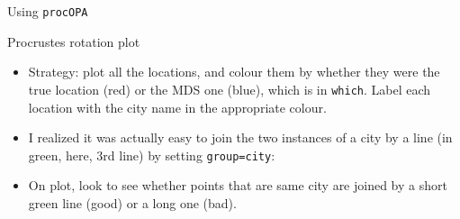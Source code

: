 \begin{frame}[fragile]{Using \texttt{procOPA}}
\begin{itemize}
\begin{knitrout}
\begin{kframe}
{\ttfamily\noindent\bfseries\color{errorcolor}{\#\# Error in with(ontario.pro, data.frame(x = c(Ahat[, 1], Bhat[, 1]), y = c(Ahat[, : object 'ontario.pro' not found}}\begin{alltt}
\end{alltt}


{\ttfamily\noindent\bfseries\color{errorcolor}{\#\# Error in eval(expr, envir, enclos): object 'dp' not found}}\end{kframe}
\end{knitrout}

  \end{itemize}
  
\end{frame}

\begin{frame}[fragile]{Procrustes rotation plot}
  
  \begin{itemize}
  \item Strategy: plot all the locations, and colour them by whether
    they were the true location (red) or the MDS one (blue), which is
    in \texttt{which}. Label each location with the city name in the
    appropriate colour.
  \item I realized it
    was actually easy to join the two instances of a city by a line
    (in green, here, 3rd line) by setting \texttt{group=city}:
\begin{knitrout}
\color{fgcolor}\begin{kframe}
\begin{alltt}
\hlkwb{=}\hlstd{(}\hlopt{+}
  \hlstd{()}\hlopt{+}
  \hlstd{(}\hlstd{(}\hlstd{=}\hlstd{)}\hlopt{+}
  \hlstd{()}
\end{alltt}


{\ttfamily\noindent\bfseries\color{errorcolor}{\#\# Error in ggplot(dp, aes(x = x, y = y, colour = which, label = city)): object 'dp' not found}}\end{kframe}
\end{knitrout}
\item On plot, look to see whether points that are same city are
  joined by a short green line (good) or a long one (bad).
  \end{itemize}
\end{frame}

